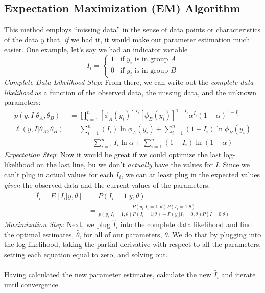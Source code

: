 \documentclass[a4paper,12pt]{scrartcl}
\begin{document}
\subsection{Expectation Maximization (EM) Algorithm}

This method employs ``missing data'' in the sense of data points
or characteristics of the data $y$ that, \emph{if} we had it, it
would make our parameter estimation much easier. One example, 
let's say we had an indicator variable
\[ I_i = \begin{cases} 1 & \text{if $y_i$ is in group $A$} \\
      0 & \text{if $y_i$ is in group $B$} \end{cases} \]
      {\sl Complete Data Likelihood Step}:
From there, we can write out the \emph{complete data likelihood}
as a function of the observed data, the missing data, and the unknown
parameters:
\begin{align*}
    p(y, I | \theta_A, \theta_B) &= \prod^n_{i=1}
      \left[  \phi_A(y_i)\right]^{I_i} 
      \left[\phi_B(y_i) \right]^{1-I_i} \alpha^{I_i}(1-\alpha)^{1-I_i}
      \\
   \ell(y,I|\theta_A, \theta_B) &= \sum^n_{i=1} (I_i) \ln \phi_A(y_i)
   + \sum^n_{i=1} (1-I_i) \ln \phi_B(y_i)  \\
   &\qquad +
   \sum^n_{i=1} I_i \ln \alpha +\sum^n_{i=1} (1-I_i) \ln (1-\alpha)
\end{align*}
{\sl Expectation Step}: 
Now it would be great if we could optimize the last log-likelihood
on the last line, bu we don't \emph{actually} have the values for
$I$. Since we can't plug in actual values for
each $I_i$, we can at least plug in the expected values \emph{given}
the observed data and the current values of the parameters.
\begin{align*}
   \hat{I}_i = E[I_i | y, \theta] &= P(I_i=1 | y, \theta)\\
   &= \frac{ P(y_i | I_i = 1, \theta) P(I_i=1 | \theta)}{
      p(y_i|I_i = 1, \theta) P(I_i=1 |\theta) + 
      P(y_i|I_i=0, \theta) P(I=0|\theta)}
\end{align*}
{\sl Maximization Step}: Next, we plug $\hat{I}_i$ into the complete
data likelihood and find the optimal estimates, $\hat{\theta}$,
for all of our parameters, $\theta$. We do that by plugging into
the log-likelihood, taking the partial derivative with respect to all
the parameters, setting each equation equal to zero, and solving out.
\\
\\
Having calculated the new parameter estimates, calculate the new
$\hat{I}_i$ and iterate until convergence.
\end{document}
